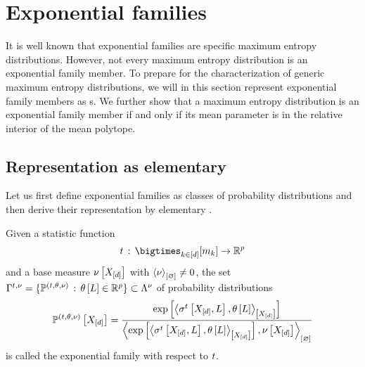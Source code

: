 \section{Exponential families}\label{sec:expFamily}

It is well known that exponential families are specific maximum entropy distributions.
However, not every maximum entropy distribution is an exponential family member.
To prepare for the characterization of generic maximum entropy distributions, we will in this section represent exponential family members as \ComputationActivationNetwork{}s.
We further show that a maximum entropy distribution is an exponential family member if and only if its mean parameter is in the relative interior of the mean polytope.

\subsection{Representation as elementary \ComputationActivationNetworks{}}


Let us first define exponential families as classes of probability distributions and then derive their representation by elementary \ComputationActivationNetworks{}.

\begin{definition}
    \label{def:expFamily}
    Given a statistic function
    \begin{align*}
        \sstat \defcols \facstates \rightarrow \parspace
    \end{align*}
    and a base measure $\nu\left[X_{[d]}\right]$ with $\left\langle \nu\right\rangle_{\left[ \varnothing \right]}\neq0$, the set $\Gamma^{t,\nu}=\{\mathbb{P}^{(t,\theta,\nu)}\,:\,\theta\left[L\right]\in\mathbb{R}^{p}\}\subset\Lambda^{\nu}$ of probability distributions
    \begin{align*}
        \mathbb{P}^{(t,\theta,\nu)}\left[X_{[d]}\right]
        = \frac{
            \mathrm{exp}\left[\left\langle \sigma^{t}\left[X_{[d]},L\right],\theta\left[L\right]\right\rangle_{\left[ X_{[d]} \right]}\right]
        }{
            \left\langle \mathrm{exp}\left[\left\langle \sigma^{t}\left[X_{[d]},L\right],\theta\left[L\right]\right\rangle_{\left[ X_{[d]} \right]}\right],\nu\left[X_{[d]}\right]\right\rangle_{\left[ \varnothing \right]}
        }
    \end{align*}
    is called the exponential family with respect to $t$.
\end{definition}

